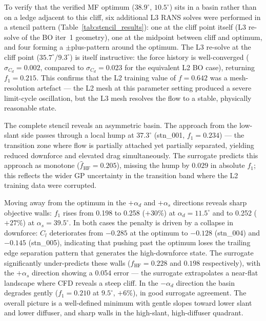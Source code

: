 To verify that the verified MF optimum ($38.9^\circ$, $10.5^\circ$) sits in a basin rather than on a ledge adjacent to this cliff, six additional L3 RANS solves were performed in a stencil pattern (Table~\ref{tab:stencil_results}): one at the cliff point itself (L3 re-solve of the BO iter~1 geometry), one at the midpoint between cliff and optimum, and four forming a $\pm$plus-pattern around the optimum. The L3 re-solve at the cliff point ($35.7^\circ/9.3^\circ$) is itself instructive: the force history is well-converged ($\sigma_{C_d}=0.002$, compared to $\sigma_{C_d}=0.023$ for the equivalent L2 BO case), returning $f_1=0.215$. This confirms that the L2 training value of $f=0.642$ was a mesh-resolution artefact — the L2 mesh at this parameter setting produced a severe limit-cycle oscillation, but the L3 mesh resolves the flow to a stable, physically reasonable state.

The complete stencil reveals an asymmetric basin. The approach from the low-slant side passes through a local hump at $37.3^\circ$ (stn\_001, $f_1=0.234$) — the transition zone where flow is partially attached yet partially separated, yielding reduced downforce and elevated drag simultaneously. The surrogate predicts this approach as monotone ($\hat{f}_\mathrm{HF}=0.205$), missing the hump by $0.029$ in absolute $f_1$; this reflects the wider GP uncertainty in the transition band where the L2 training data were corrupted.

Moving away from the optimum in the $+\alpha_d$ and $+\alpha_s$ directions reveals sharp objective walls: $f_1$ rises from 0.198 to 0.258 ($+30\%$) at $\alpha_d=11.5^\circ$ and to 0.252 ($+27\%$) at $\alpha_s=39.5^\circ$. In both cases the penalty is driven by a collapse in downforce: $C_l$ deteriorates from $-0.285$ at the optimum to $-0.128$ (stn\_004) and $-0.145$ (stn\_005), indicating that pushing past the optimum loses the trailing edge separation pattern that generates the high-downforce state. The surrogate significantly under-predicts these walls ($\hat{f}_\mathrm{HF}=0.228$ and $0.198$ respectively), with the $+\alpha_s$ direction showing a 0.054 error — the surrogate extrapolates a near-flat landscape where CFD reveals a steep cliff. In the $-\alpha_d$ direction the basin degrades gently ($f_1=0.210$ at $9.5^\circ$, $+6\%$), in good surrogate agreement. The overall picture is a well-defined minimum with gentle slopes toward lower slant and lower diffuser, and sharp walls in the high-slant, high-diffuser quadrant.

